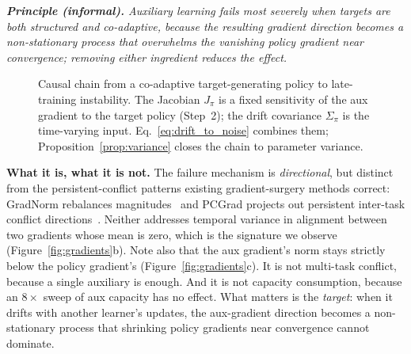 \documentclass{article}
\theoremstyle{plain}
\theoremstyle{definition}
\theoremstyle{remark}
\begin{document}
\emph{\textbf{Principle (informal).} Auxiliary learning fails most
severely when targets are both structured and co-adaptive, because
the resulting gradient direction becomes a non-stationary process
that overwhelms the vanishing policy gradient near convergence;
removing either ingredient reduces the effect.}

\begin{figure}[t]
\centering
{}
\caption{Causal chain from a co-adaptive target-generating policy to late-training instability. The Jacobian $J_\pi$ is a fixed sensitivity of the aux gradient to the target policy (Step~2); the drift covariance $\Sigma_\pi$ is the time-varying input. Eq.~\eqref{eq:drift_to_noise} combines them; Proposition~\ref{prop:variance} closes the chain to parameter variance.}
\label{fig:causal_chain}
\end{figure}

\textbf{What it is, what it is not.} The failure mechanism is
\emph{directional}, but distinct from the persistent-conflict
patterns existing gradient-surgery methods correct: GradNorm
rebalances magnitudes~\cite{chen2018gradnorm} and PCGrad projects
out persistent inter-task conflict directions~\cite{yu2020gradient}.
Neither addresses temporal variance in alignment between two gradients
whose mean is zero, which is the signature we observe
(Figure~\ref{fig:gradients}b). Note also that the aux gradient's
norm stays strictly below the policy gradient's
(Figure~\ref{fig:gradients}c). It is not multi-task conflict,
because a single auxiliary is enough. And it is not capacity
consumption, because an $8\times$ sweep of aux capacity has no
effect. What matters is the \emph{target}: when it drifts
with another learner's updates, the aux-gradient direction becomes
a non-stationary process that shrinking policy gradients near
convergence cannot dominate.
\end{document}
